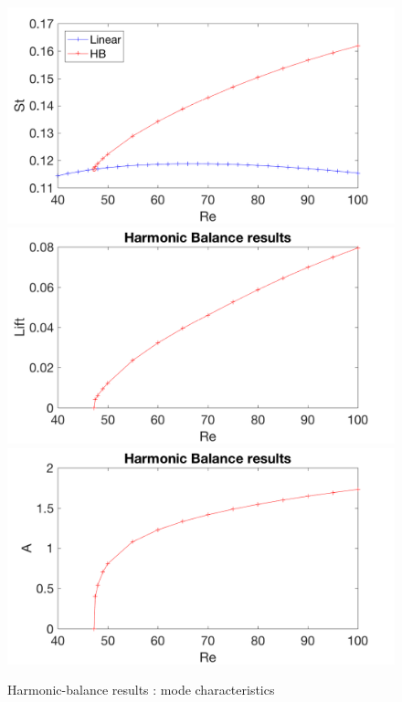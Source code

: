 \documentclass[twocolumn,10pt]{asme2ej}
\begin{document}
\begin{figure}
\begin{center}
\includegraphics[width=.9 \linewidth]{Cylinder_Strouhal_Re_HB.png}
\includegraphics[width=.9 \linewidth]{Cylinder_Lift_Re_SC.png}
\includegraphics[width=.9 \linewidth]{Cylinder_Energy_Re_SC.png}
\end{center}
\caption{Harmonic-balance results : mode characteristics}
\label{fig:HB}
\end{figure}
\end{document}
